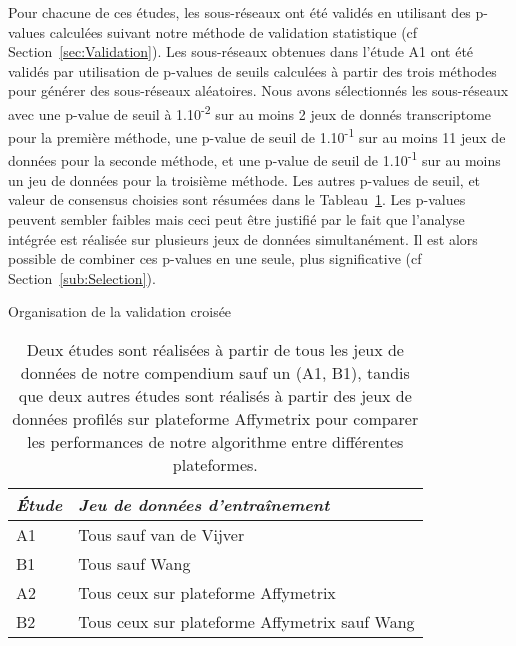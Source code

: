 		Pour chacune de ces études, les sous-réseaux ont été validés en utilisant des p-values calculées suivant notre méthode de validation statistique (cf Section~\ref{sec:Validation}).
		Les sous-réseaux obtenues dans l'étude A1 ont été validés par utilisation de p-values de seuils calculées à partir des trois méthodes pour générer des sous-réseaux aléatoires.
		Nous avons sélectionnés les sous-réseaux avec une p-value de seuil à 1.10\textsuperscript{-2} sur au moins 2 jeux de donnés transcriptome pour la première méthode, une p-value de seuil de 1.10\textsuperscript{-1} sur au moins 11 jeux de données pour la seconde méthode, et une p-value de seuil de 1.10\textsuperscript{-1} sur au moins un jeu de données pour la troisième méthode.
		Les autres p-values de seuil, et valeur de consensus choisies sont résumées dans le Tableau~\ref{tab:Res1Train}.
		Les p-values peuvent sembler faibles mais ceci peut être justifié par le fait que l'analyse intégrée est réalisée sur plusieurs jeux de données simultanément. Il est alors possible de combiner ces p-values en une seule, plus significative (cf Section~\ref{sub:Selection}).

		\begin{table}
			\begin{center}
				\caption{Organisation de la validation croisée}
				\begin{tabular}{ll}
					\toprule
					\emph{Étude} & \emph{Jeu de données d'entraînement} \\
					\midrule
					A1 &  Tous sauf van de Vijver                       \\
					B1 &  Tous sauf Wang                                \\
					A2 &  Tous ceux sur plateforme Affymetrix           \\
					B2 &  Tous ceux sur plateforme Affymetrix sauf Wang \\
					\bottomrule
				\end{tabular}
				\label{tab:Res1Train}
				\vspace{5ex}
				\caption*{Deux études sont réalisées à partir de tous les jeux de données de notre compendium sauf un (A1, B1), tandis que deux autres études sont réalisés à partir des jeux de données profilés sur plateforme Affymetrix pour comparer les performances de notre algorithme entre différentes plateformes.}
			\end{center}
		\end{table}

